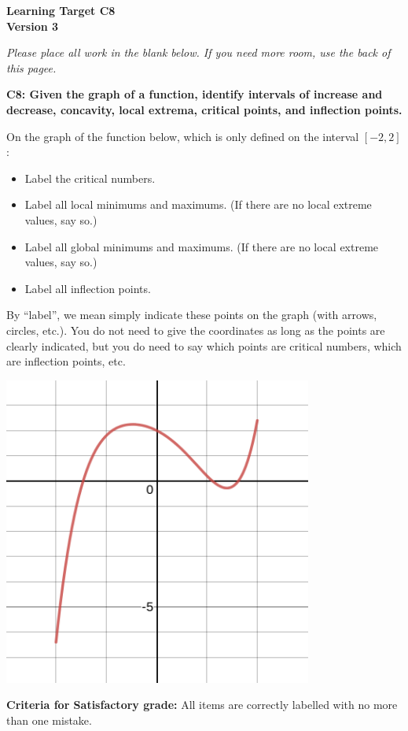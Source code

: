 \documentclass[10pt]{article}
\begin{document}
	\vspace*{0in}

		\begin{center}
			\textbf{Learning Target C8 \\
			Version 3}
		\end{center}

\emph{Please place all work in the blank below. If you need more room, use the back of this pagee.}

\begin{framed}
	\textbf{C8: Given the graph of a function, identify intervals of increase and decrease, concavity, local extrema, critical points, and inflection points. }
\end{framed}


On the graph of the function below, which is only defined on the interval $[-2,2]$: 

\begin{itemize}
    \item Label the critical numbers. 
    \item Label all local minimums and maximums. (If there are no local extreme values, say so.) 
    \item Label all global minimums and maximums. (If there are no local extreme values, say so.) 
    \item Label all inflection points. 
\end{itemize}
By ``label'', we mean simply indicate these points on the graph (with arrows, circles, etc.). You do not need to give the coordinates as long as the points are clearly indicated, but you do need to say which points are critical numbers, which are inflection points, etc. 

\begin{center}
    \includegraphics[width=4in]{ltc8-nov14.png}
\end{center}

\vfill

\begin{small}
    \begin{framed}
        	\textbf{Criteria for Satisfactory grade:} All items are correctly labelled with no more than one mistake. 
    \end{framed}

\end{small}
\end{document}
